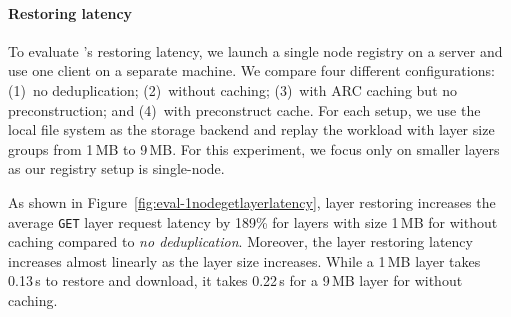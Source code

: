 \paragraph{Restoring latency}
%
%
To evaluate \sysname{}'s restoring latency, we launch a single node registry on a server
and use one client on a separate machine.
%
We compare four different configurations:
(1)~no deduplication;
(2)~\sysname without caching;
(3)~\sysname with ARC caching but no preconstruction; and
(4)~\sysname with preconstruct cache.
%
For each setup, we use the local file system as the storage backend and replay the
\dal workload with layer size groups from 1\,MB to 9\,MB. For this experiment, we focus
only on smaller layers as our registry setup is single-node.
%
%

%
As shown in Figure~\ref{fig:eval-1nodegetlayerlatency}, 
layer restoring increases the average \texttt{GET} layer request latency by 189\% for layers 
with size 1\,MB for \sysname without caching compared to \emph{no deduplication}.
%
Moreover, the layer restoring latency increases almost linearly as the layer size increases.
%
While a 1\,MB layer takes 0.13\,s to restore and download, 
it takes 0.22\,s for a 9\,MB layer for \sysname without caching.

